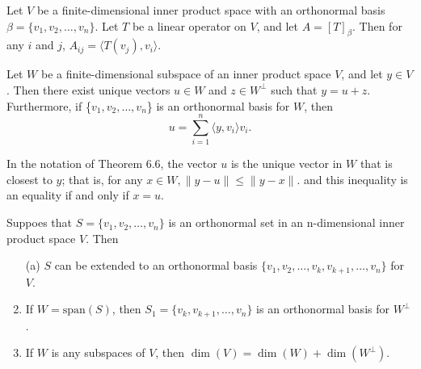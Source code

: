 \vspace{3cm}
\begin{corollary}
    Let \(V\) be a finite-dimensional inner product space with an orthonormal basis \(\beta = \{v_1, v_2, \dots , v_n\}\). Let \(T\) be a linear operator on \(V\), and let \(A = [T]_{\beta}\). Then for any \(i\) and \(j\), \(A_{ij} = \langle T(v_j), v_i \rangle\).
\end{corollary}
\vspace{3cm}
\begin{theorem}
    Let \(W\) be a finite-dimensional subspace of an inner product space \(V\), and let \(y\in V\). Then there exist unique vectors \(u \in W\) and \(z \in W^{\perp}\) such that \(y = u + z\).
    Furthermore, if \{\(v_1, v_2, \dots , v_n\)\} is an orthonormal basis for \(W\), then
    \[
    u = \sum_{i=1}^{n} \langle y, v_i \rangle v_i.
    \]
\end{theorem}
\vspace{5cm}
\begin{corollary}
    In the notation of Theorem 6.6, the vector \(u\) is the unique vector in \(W\) that is closest to \(y\); that is, for any \(x \in W, \lVert y - u \rVert \leq \lVert y - x \rVert\). and this inequality is an equality if and only if \(x = u\).
\end{corollary}
\newpage
\begin{theorem}
    Suppoes that \(S = \{v_1, v_2, \dots , v_n\}\) is an orthonormal set in an n-dimensional inner product space \(V\). Then
    \begin{enumerate}
        \item[(a)] \(S\) can be extended to an orthonormal basis \(\{v_1, v_2, \dots , v_k, v_{k+1}, \dots, v_n \}\) for \(V\).
        \item If \(W = \text{span}(S)\), then \( S_1 = \{v_k, v_{k+1}, \dots, v_n\} \) is an orthonormal basis for \(W^{\perp}\).
        \item If \(W\) is any subspaces of \(V\), then \( \dim(V)=\dim(W) + \dim(W^{\perp})\).
    \end{enumerate}
\end{theorem}
\vspace{7cm}
